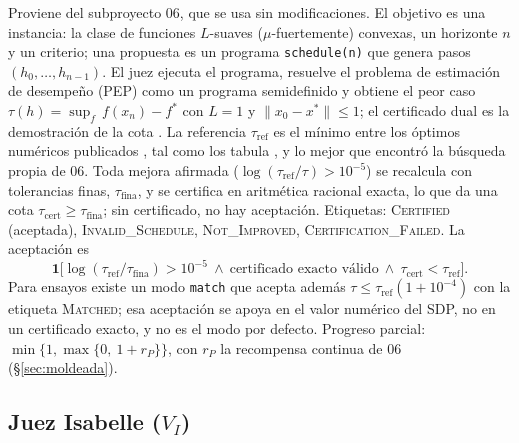 \documentclass[11pt,a4paper]{article}
\theoremstyle{definition}
\theoremstyle{remark}
\newcommand{\lab}[1]{\textsc{#1}}
\newcommand{\VI}{\texorpdfstring{$V_I$}{V\_I}}
\begin{document}
Proviene del subproyecto 06, que se usa sin modificaciones. El objetivo es una instancia: la clase de funciones $L$-suaves ($\mu$-fuertemente) convexas, un horizonte $n$ y un criterio; una propuesta es un programa \texttt{schedule(n)} que genera pasos $(h_0,\dots,h_{n-1})$. El juez ejecuta el programa, resuelve el problema de estimación de desempeño (PEP) como un programa semidefinido y obtiene el peor caso $\tau(h) = \sup_f\, f(x_n) - f^*$ con $L = 1$ y $\|x_0 - x^*\| \le 1$; el certificado dual es la demostración de la cota \citep{DroriTeboulle2014,TaylorHendrickxGlineur2017}. La referencia $\tau_{\mathrm{ref}}$ es el mínimo entre los óptimos numéricos publicados \citep{DasGuptaVanParysRyu2024}, tal como los tabula \citet{GrimmerShuWang2024}, y lo mejor que encontró la búsqueda propia de 06. Toda mejora afirmada ($\log(\tau_{\mathrm{ref}}/\tau) > 10^{-5}$) se recalcula con tolerancias finas, $\tau_{\mathrm{fina}}$, y se certifica en aritmética racional exacta, lo que da una cota $\tau_{\mathrm{cert}} \ge \tau_{\mathrm{fina}}$; sin certificado, no hay aceptación. Etiquetas: \lab{Certified} (aceptada), \lab{Invalid\_Schedule}, \lab{Not\_Improved}, \lab{Certification\_Failed}. La aceptación es
\[
  \mathbf{1}\big[\log(\tau_{\mathrm{ref}}/\tau_{\mathrm{fina}}) > 10^{-5}\ \wedge\ \text{certificado exacto válido}\ \wedge\ \tau_{\mathrm{cert}} < \tau_{\mathrm{ref}}\big].
\]
Para ensayos existe un modo \texttt{match} que acepta además $\tau \le \tau_{\mathrm{ref}}(1+10^{-4})$ con la etiqueta \lab{Matched}; esa aceptación se apoya en el valor numérico del SDP, no en un certificado exacto, y no es el modo por defecto. Progreso parcial: $\min\{1, \max\{0,\ 1 + r_P\}\}$, con $r_P$ la recompensa continua de 06 (§\ref{sec:moldeada}).

\AvisoSandboxVP

\subsection{Juez Isabelle (\VI)}\label{sec:VI}
\end{document}
